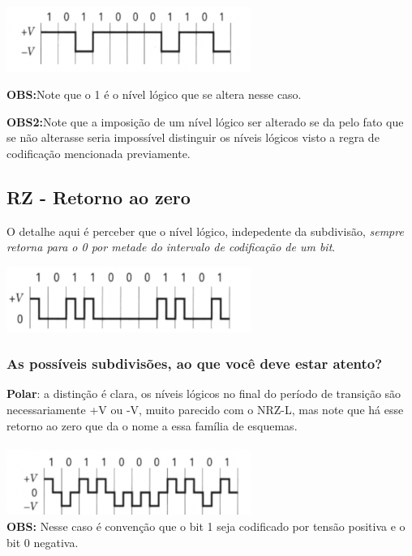\includegraphics[width=0.6\textwidth]{../assets/nrzm.png}

\textbf{OBS:}Note que o 1 é o nível lógico que se altera nesse caso.

\textbf{OBS2:}Note que a imposição de um nível lógico ser alterado se da pelo fato que se não alterasse seria impossível distinguir os níveis lógicos visto a regra de codificação
mencionada previamente.

\subsection{RZ - Retorno ao zero}

O detalhe aqui é perceber que o nível lógico, indepedente da subdivisão, \textit{sempre retorna para o 0 por metade do intervalo de codificação de um bit}.

\includegraphics[width=0.6\textwidth]{../assets/rz.png}


\subsubsection{As possíveis subdivisões, ao que você deve estar atento?}

\textbf{Polar}: a distinção é clara, os níveis lógicos no final do período de transição são necessariamente +V ou -V, muito parecido com o NRZ-L, mas note que há esse retorno ao
zero que da o nome a essa família de esquemas.
\\
\\
\includegraphics[width=0.6\textwidth]{../assets/polar-rz.png}
\\
\textbf{OBS:} Nesse caso é convenção que o bit 1 seja codificado por tensão positiva e o bit 0 negativa.
\\

